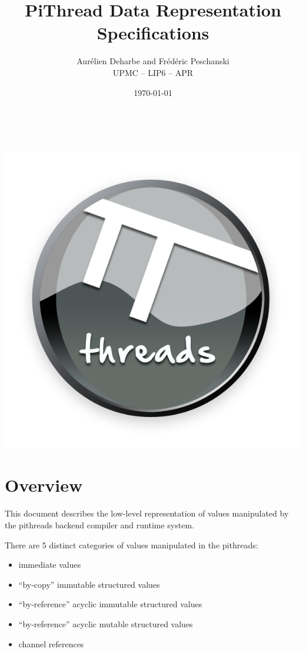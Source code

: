 \documentclass[a4paper,11pt]{article}
\title{PiThread Data Representation Specifications}
\date{\today}
\author{Aurélien Deharbe and Fr\'ed\'eric Peschanski\\ UPMC -- LIP6 -- APR}
\begin{document}
\renewcommand{\contentsname}{Table of contents}
\maketitle
$ $\newline
$ $\newline
\begin{center}
\includegraphics[scale=0.45]{pithreads.png}
\end{center}
\newpage
\tableofcontents
\newpage

\section{Overview}

This document describes the low-level representation of values manipulated
by the pithreads backend compiler and runtime system.

There are 5 distinct categories of values manipulated in the pithreads:
\begin{itemize}
\item immediate values
\item ``by-copy'' immutable structured values
\item ``by-reference'' acyclic immutable structured values
\item ``by-reference'' acyclic mutable structured values
\item channel references
\end{itemize}
\end{document}
